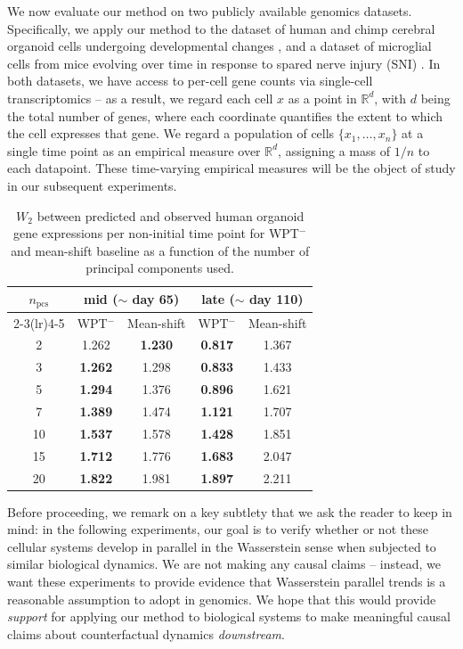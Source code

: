 \documentclass[11pt]{article}
\begin{document}
We now evaluate our method on two publicly available genomics datasets. Specifically, we apply our method to the dataset of human and chimp cerebral organoid cells undergoing developmental changes \citep{kanton2019organoid}, and a dataset of microglial cells from mice evolving over time in response to spared nerve injury (SNI) \citep{tansley2022single}. In both datasets, we have access to per-cell gene counts via single-cell transcriptomics -- as a result, we regard each cell $x$ as a point in $\mathbb{R}^d$, with $d$ being the total number of genes, where each coordinate quantifies the extent to which the cell expresses that gene. We regard a population of cells $\{x_1, \dots, x_n\}$ at a single time point as an empirical measure over $\mathbb{R}^d$, assigning a mass of $1/n$ to each datapoint. These time-varying empirical measures will be the object of study in our subsequent experiments.


\begin{table}[h]
\centering
\small
\begin{tabular}{ccccc}
\toprule
$n_{\mathrm{pcs}}$ & \multicolumn{2}{c}{mid ($\sim$ day 65)} & \multicolumn{2}{c}{late ($\sim$ day 110)} \\
\cmidrule(lr){2-3}\cmidrule(lr){4-5}
 & WPT$^-$ & Mean-shift & WPT$^-$ & Mean-shift \\
\midrule
2  & 1.262 & \textbf{1.230} & \textbf{0.817} & 1.367 \\
3  & \textbf{1.262} & 1.298 & \textbf{0.833} & 1.433 \\
5  & \textbf{1.294} & 1.376 & \textbf{0.896} & 1.621 \\
7  & \textbf{1.389} & 1.474 & \textbf{1.121} & 1.707 \\
10 & \textbf{1.537} & 1.578 & \textbf{1.428} & 1.851 \\
15 & \textbf{1.712} & 1.776 & \textbf{1.683} & 2.047 \\
20 & \textbf{1.822} & 1.981 & \textbf{1.897} & 2.211 \\
\bottomrule
\end{tabular}
\caption{$W_2$ between predicted and observed human organoid gene expressions per non-initial time point for WPT$^-$ and mean-shift baseline as a function of the number of principal components used.}
\label{tab:kanton_w2_npcs}
\end{table}

Before proceeding, we remark on a key subtlety that we ask the reader to keep in mind: in the following experiments, our goal is to verify whether or not these cellular systems develop in parallel in the Wasserstein sense when subjected to similar biological dynamics. We are not making any causal claims -- instead, we want these experiments to provide evidence that Wasserstein parallel trends is a reasonable assumption to adopt in genomics. We hope that this would provide \textit{support} for applying our method to biological systems to make meaningful causal claims about counterfactual dynamics \textit{downstream}. 
\end{document}
